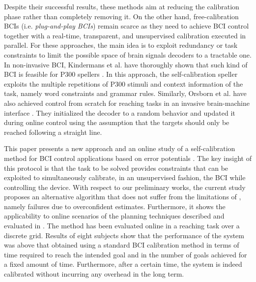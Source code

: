 Despite their successful results, these methods aim at reducing the calibration phase rather than completely removing it. On the other hand, free-calibration BCIs (i.e. \textit{plug-and-play BCIs}) remain scarce as they need to achieve BCI control together with a real-time, transparent, and unsupervised calibration executed in parallel. For these approaches, the main idea is to exploit redundancy or task constraints to limit the possible space of brain signals decoders to a tractable one. In non-invasive BCI, Kindermans et al. have thoroughly shown that such kind of BCI is feasible for P300 spellers \cite{Kindermans2012a,kindermans2014true}. In this approach, the self-calibration speller exploits the multiple repetitions of P300 stimuli and context information of the task, namely word constraints and grammar rules. Similarly, Orsborn et al. have also achieved control from scratch for reaching tasks in an invasive brain-machine interface \cite{Orsborn12, orsborn2014closed}. They initialized the decoder to a random behavior and updated it during online control using the assumption that the targets should only be reached following a straight line.


This paper presents a new approach and an online study of a self-calibration method for BCI control applications based on error potentials \cite{chavarriaga2010learning, iturrate13}. The key insight of this protocol is that the task to be solved provides constraints that can be exploited to simultaneously calibrate, in an unsupervised fashion, the BCI while controlling the device. With respect to our preliminary works, the current study proposes an alternative algorithm that does not suffer from the limitations of \cite{grizou2014calibration}, namely failures due to overconfident estimates. Furthermore, it shows the applicability to online scenarios of the planning techniques described and evaluated in \cite{grizou2014interactive}. 
%
The method has been evaluated online in a reaching task over a discrete grid. Results of eight subjects show that the performance of the system was above that obtained using a standard BCI calibration method in terms of time required to reach the intended goal and in the number of goals achieved for a fixed amount of time. Furthermore, after a certain time, the system is indeed calibrated without incurring any overhead in the long term.


